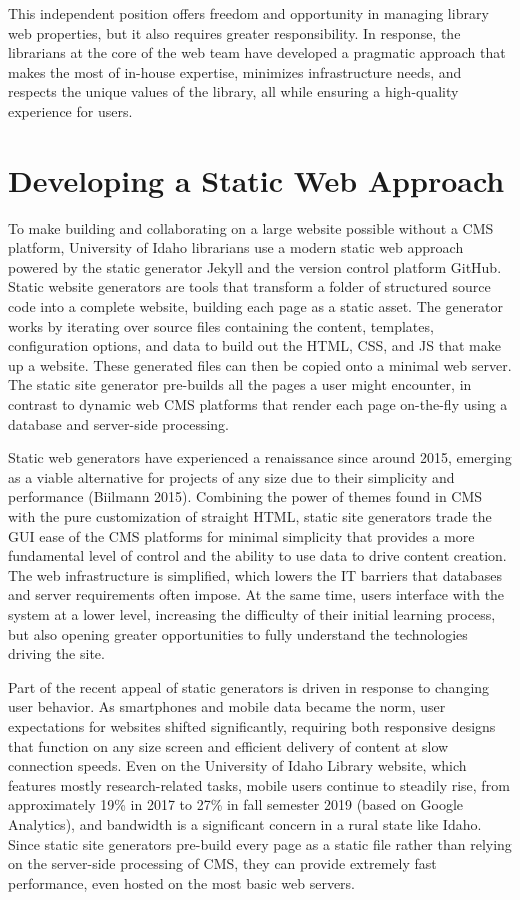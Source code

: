\documentclass{book}
\begin{document}
This independent position offers freedom and opportunity in managing library
web properties, but it also requires greater responsibility. In response, the
librarians at the core of the web team have developed a pragmatic approach
that makes the most of in-house expertise, minimizes infrastructure needs, and
respects the unique values of the library, all while ensuring a high-quality
experience for users.

\hypertarget{developing-a-static-web-approach}{%
\section{Developing a Static Web
Approach}\label{developing-a-static-web-approach}}

To make building and collaborating on a large website possible without a CMS
platform, University of Idaho librarians use a modern static web approach
powered by the static generator Jekyll and the version control platform
GitHub. Static website generators are tools that transform a folder of
structured source code into a complete website, building each page as a static
asset. The generator works by iterating over source files containing the
content, templates, configuration options, and data to build out the HTML,
CSS, and JS that make up a website. These generated files can then be copied
onto a minimal web server. The static site generator pre-builds all the pages
a user might encounter, in contrast to dynamic web CMS platforms that render
each page on-the-fly using a database and server-side processing.

Static web generators have experienced a renaissance since around 2015,
emerging as a viable alternative for projects of any size due to their
simplicity and performance (Biilmann 2015). Combining the power of themes
found in CMS with the pure customization of straight HTML, static site
generators trade the GUI ease of the CMS platforms for minimal simplicity that
provides a more fundamental level of control and the ability to use data to
drive content creation. The web infrastructure is simplified, which lowers the
IT barriers that databases and server requirements often impose. At the same
time, users interface with the system at a lower level, increasing the
difficulty of their initial learning process, but also opening greater
opportunities to fully understand the technologies driving the site.

Part of the recent appeal of static generators is driven in response to
changing user behavior. As smartphones and mobile data became the norm, user
expectations for websites shifted significantly, requiring both responsive
designs that function on any size screen and efficient delivery of content at
slow connection speeds. Even on the University of Idaho Library website, which
features mostly research-related tasks, mobile users continue to steadily
rise, from approximately 19\% in 2017 to 27\% in fall semester 2019 (based on
Google Analytics), and bandwidth is a significant concern in a rural state
like Idaho. Since static site generators pre-build every page as a static file
rather than relying on the server-side processing of CMS, they can provide
extremely fast performance, even hosted on the most basic web servers.
\end{document}
